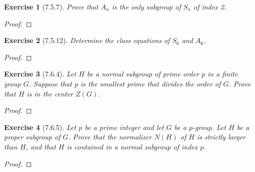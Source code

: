 \documentclass[12pt]{article}
\newtheorem*{exer}{Exercise}
\begin{document}

\begin{exer}[7.5.7]

    Prove that $A_n$ is the only subgroup of $S_n$ of index 2.

\end{exer}

\begin{proof}

\end{proof}


\begin{exer}[7.5.12]

    Determine the class equations of $S_6$ and $A_6$.

\end{exer}

\begin{proof}

\end{proof}


\begin{exer}[7.6.4]

    Let $H$ be a normal subgroup of prime order $p$ in a finite group
    $G$. Suppose that $p$ is the smallest prime that divides the order
    of $G$. Prove that $H$ is in the center $Z(G)$.

\end{exer}

\begin{proof}

\end{proof}


\begin{exer}[7.6.5]

    Let $p$ be a prime integer and let $G$ be a $p$-group. Let $H$ be a
    proper subgroup of $G$. Prove that the normalizer $N(H)$ of $H$ is
    strictly larger than $H$, and that $H$ is contained in a normal
    subgroup of index $p$.

\end{exer}

\begin{proof}

\end{proof}
\end{document}

